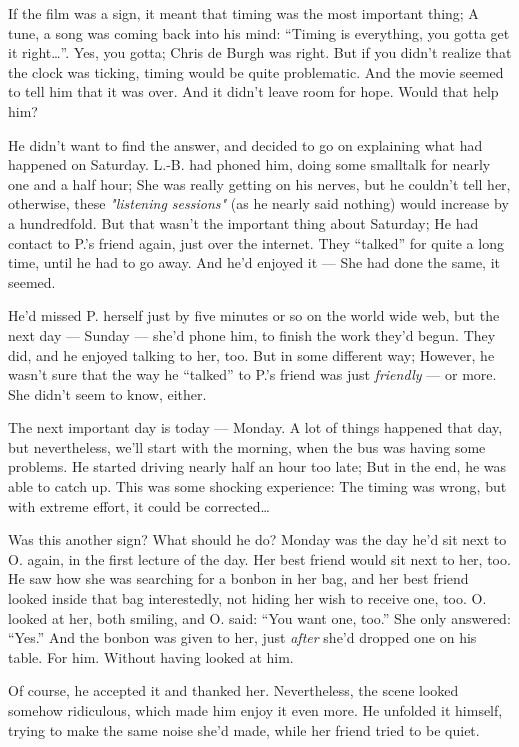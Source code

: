 If the film was a sign, it meant that timing was the most important thing; A tune, a song was coming back into his mind: \enquote{Timing is everything, you gotta get it right\ldots}. Yes, you gotta; Chris de Burgh was right. 
But if you didn't realize that the clock was ticking, timing would be quite problematic. And the movie seemed to tell him that it was over. 
And it didn't leave room for hope. 
Would that help him?

He didn't want to find the answer, and decided to go on explaining what had happened on Saturday. L.-B. had phoned him, doing some smalltalk for nearly one and a half hour; She was really getting on his nerves, but he couldn't tell her, otherwise, these \emph{"listening sessions"} (as he nearly said nothing) would increase by a hundredfold. 
But that wasn't the important thing about Saturday; He had contact to P.'s friend again, just over the internet. They \enquote{talked} for quite a long time, until he had to go away. And he'd enjoyed it --- She had done the same, it seemed.

He'd missed P. herself just by five minutes or so on the world wide web, but the next day --- Sunday --- she'd phone him, to finish the work they'd begun. 
They did, and he enjoyed talking to her, too. But in some different way; However, he wasn't sure that the way he \enquote{talked} to P.'s friend was just \emph{friendly} --- or more. She didn't seem to know, either.

The next important day is today --- Monday. 
A lot of things happened that day, but nevertheless, we'll start with the morning, when the bus was having some problems. 
He started driving nearly half an hour too late; But in the end, he was able to catch up. This was some shocking experience: The timing was wrong, but with extreme effort, it could be corrected\ldots

Was this another sign? What should he do?
Monday was the day he'd sit next to O. again, in the first lecture of the day. Her best friend would sit next to her, too. He saw how she was searching for a bonbon in her bag, and her best friend looked inside that bag interestedly, not hiding her wish to receive one, too. O. looked at her, both smiling, and O. said: \enquote{You want one, too.}
She only answered: \enquote{Yes.}
And the bonbon was given to her, just \emph{after} she'd dropped one on his table. 
For him. 
Without having looked at him.

Of course, he accepted it and thanked her. Nevertheless, the scene looked somehow ridiculous, which made him enjoy it even more. 
He unfolded it himself, trying to make the same noise she'd made, while her friend tried to be quiet.

